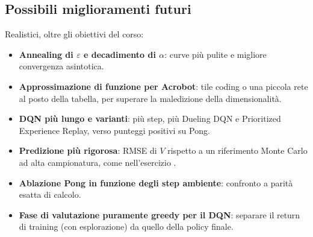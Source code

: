 \subsection{Possibili miglioramenti futuri}
\label{sec:lessons-future}
Realistici, oltre gli obiettivi del corso:
\begin{itemize}[nosep]
  \item \textbf{Annealing di $\varepsilon$ e decadimento di $\alpha$}: curve pi\`u
        pulite e migliore convergenza asintotica.
  \item \textbf{Approssimazione di funzione per Acrobot}: tile coding o una
        piccola rete al posto della tabella, per superare la maledizione della
        dimensionalit\`a.
  \item \textbf{DQN pi\`u lungo e varianti}: pi\`u step, pi\`u Dueling DQN e
        Prioritized Experience Replay, verso punteggi positivi su Pong.
  \item \textbf{Predizione pi\`u rigorosa}: RMSE di $V$ rispetto a un riferimento
        Monte Carlo ad alta campionatura, come nell'esercizio .
  \item \textbf{Ablazione Pong in funzione degli step ambiente}: confronto a
        parit\`a esatta di calcolo.
  \item \textbf{Fase di valutazione puramente greedy per il DQN}: separare il
        return di training (con esplorazione) da quello della policy finale.
\end{itemize}
